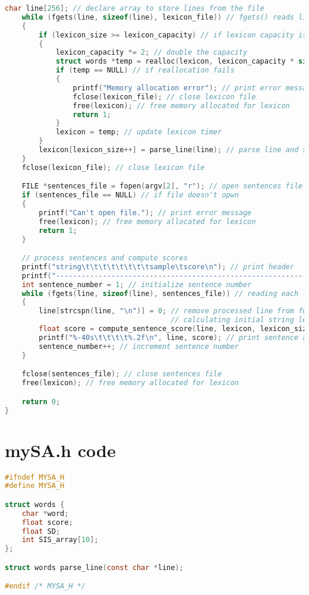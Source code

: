 \documentclass{report}
\begin{document}
\begin{lstlisting}[language=C]
    char line[256]; // declare array to store lines from the file
    while (fgets(line, sizeof(line), lexicon_file)) // fgets() reads lines from a file
    { 
        if (lexicon_size >= lexicon_capacity) // if lexicon capacity is exceeded
        { 
            lexicon_capacity *= 2; // double the capacity
            struct words *temp = realloc(lexicon, lexicon_capacity * sizeof(struct words)); // reallocate memory
            if (temp == NULL) // if reallocation fails
            { 
                printf("Memory allocation error"); // print error message
                fclose(lexicon_file); // close lexicon file
                free(lexicon); // free memory allocated for lexicon
                return 1; 
            }
            lexicon = temp; // update lexicon timer
        }
        lexicon[lexicon_size++] = parse_line(line); // parse line and store word and score in lexicon
    }
    fclose(lexicon_file); // close lexicon file

    FILE *sentences_file = fopen(argv[2], "r"); // open sentences file for reading
    if (sentences_file == NULL) // if file doesn't opwn
    { 
        printf("Can't open file."); // print error message
        free(lexicon); // free memory allocated for lexicon
        return 1; 
    }

    // process sentences and compute scores
    printf("string\t\t\t\t\t\t\t\tsample\tscore\n"); // print header
    printf("-----------------------------------------------------------------------------\n"); // separator
    int sentence_number = 1; // initialize sentence number
    while (fgets(line, sizeof(line), sentences_file)) // reading each line in the sentences file
    { 
        line[strcspn(line, "\n")] = 0; // remove processed line from further processing using strcspn() by 
                                       // calculating initial string length & nullifying 
        float score = compute_sentence_score(line, lexicon, lexicon_size); // compute sentence score
        printf("%-40s\t\t\t\t%.2f\n", line, score); // print sentence and score 
        sentence_number++; // increment sentence number
    }

    fclose(sentences_file); // close sentences file
    free(lexicon); // free memory allocated for lexicon

    return 0; 
}

\end{lstlisting}
\section{mySA.h code}
\begin{lstlisting}[language=C]
#ifndef MYSA_H
#define MYSA_H

struct words {
    char *word;
    float score;
    float SD;
    int SIS_array[10];
};

struct words parse_line(const char *line);

#endif /* MYSA_H */
\end{lstlisting}
\end{document}
